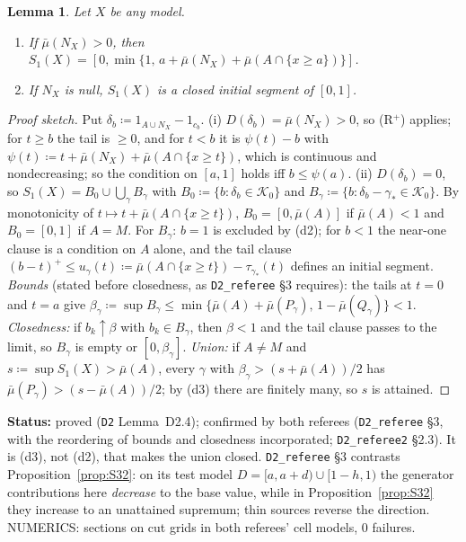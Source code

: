 \documentclass[11pt]{article}
\newtheorem{lemma}[theorem]{Lemma}
\theoremstyle{definition}
\theoremstyle{remark}
\newcommand{\src}[1]{\texttt{#1}}
\newcommand{\status}[1]{\par\smallskip\noindent\textbf{Status:} #1\par\smallskip}
\begin{document}
\begin{lemma}\label{lem:D24}
Let $X$ be any model.
\begin{enumerate}[leftmargin=*,label=(\roman*)]
\item If $\bar\mu(N_X)>0$, then $S_1(X)=[0,\min\{1,\,a+\bar\mu(N_X)+\bar\mu(A\cap\{x\ge a\})\}]$.
\item If $N_X$ is null, $S_1(X)$ is a closed initial segment of $[0,1]$.
\end{enumerate}
\end{lemma}
\begin{proof}[Proof sketch]
Put $\delta_b\coloneqq1_{A\cup N_X}-1_{c_b}$. (i) $D(\delta_b)=\bar\mu(N_X)>0$, so (R$^+$) applies; for $t\ge b$ the tail is $\ge0$, and for $t<b$ it is $\psi(t)-b$ with $\psi(t)\coloneqq t+\bar\mu(N_X)+\bar\mu(A\cap\{x\ge t\})$, which is continuous and nondecreasing; so the condition on $[a,1]$ holds iff $b\le\psi(a)$. (ii) $D(\delta_b)=0$, so $S_1(X)=B_0\cup\bigcup_\gamma B_\gamma$ with $B_0\coloneqq\{b:\delta_b\in\mathcal K_0\}$ and $B_\gamma\coloneqq\{b:\delta_b-\gamma_*\in\mathcal K_0\}$. By monotonicity of $t\mapsto t+\bar\mu(A\cap\{x\ge t\})$, $B_0=[0,\bar\mu(A)]$ if $\bar\mu(A)<1$ and $B_0=[0,1]$ if $A=M$. For $B_\gamma$: $b=1$ is excluded by (d2); for $b<1$ the near-one clause is a condition on $A$ alone, and the tail clause $(b-t)^+\le u_\gamma(t)\coloneqq\bar\mu(A\cap\{x\ge t\})-\tau_{\gamma_*}(t)$ defines an initial segment. \emph{Bounds} (stated before closedness, as \src{D2\_referee} \S3 requires): the tails at $t=0$ and $t=a$ give $\beta_\gamma\coloneqq\sup B_\gamma\le\min\{\bar\mu(A)+\bar\mu(P_\gamma),\,1-\bar\mu(Q_\gamma)\}<1$. \emph{Closedness:} if $b_k\uparrow\beta$ with $b_k\in B_\gamma$, then $\beta<1$ and the tail clause passes to the limit, so $B_\gamma$ is empty or $[0,\beta_\gamma]$. \emph{Union:} if $A\ne M$ and $s\coloneqq\sup S_1(X)>\bar\mu(A)$, every $\gamma$ with $\beta_\gamma>(s+\bar\mu(A))/2$ has $\bar\mu(P_\gamma)>(s-\bar\mu(A))/2$; by (d3) there are finitely many, so $s$ is attained.
\end{proof}
\status{proved (\src{D2} Lemma~D2.4); confirmed by both referees (\src{D2\_referee} \S3, with the reordering of bounds and closedness incorporated; \src{D2\_referee2} \S2.3). It is (d3), not (d2), that makes the union closed. \src{D2\_referee} \S3 contrasts Proposition~\ref{prop:S32}: on its test model $D=[a,a+d)\cup[1-h,1)$ the generator contributions here \emph{decrease} to the base value, while in Proposition~\ref{prop:S32} they increase to an unattained supremum; thin sources reverse the direction. NUMERICS: sections on cut grids in both referees' cell models, 0 failures.}
\end{document}
